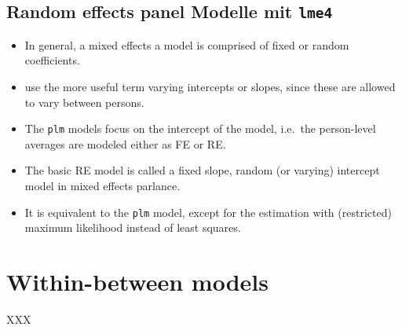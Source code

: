 \documentclass[
]{book}
\providecommand{\tightlist}{%
  \setlength{\itemsep}{0pt}\setlength{\parskip}{0pt}}
\begin{document}
\hypertarget{random-effects-panel-modelle-mit-lme4}{%
\section{\texorpdfstring{Random effects panel Modelle mit \texttt{lme4}}{Random effects panel Modelle mit lme4}}\label{random-effects-panel-modelle-mit-lme4}}

\begin{itemize}
\tightlist
\item
  In general, a mixed effects a model is comprised of fixed or random coefficients.
\item
  \citet{gh} use the more useful term varying intercepts or slopes, since these are allowed to vary between persons.
\item
  The \texttt{plm} models focus on the intercept of the model, i.e.~the person-level averages are modeled either as FE or RE.
\item
  The basic RE model is called a fixed slope, random (or varying) intercept model in mixed effects parlance.
\item
  It is equivalent to the \texttt{plm} model, except for the estimation with (restricted) maximum likelihood instead of least squares.
\end{itemize}

\hypertarget{within-between-models}{%
\chapter{Within-between models}\label{within-between-models}}

XXX

  
\end{document}
